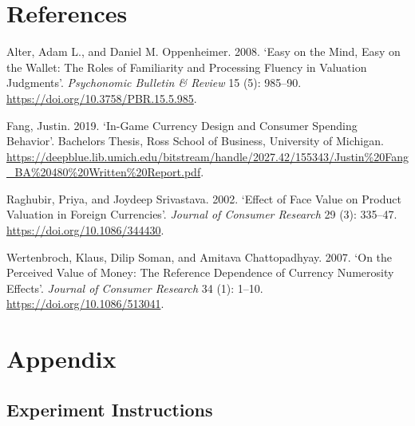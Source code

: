 \documentclass[
]{report}
\newlength{\cslhangindent}
\newenvironment{CSLReferences}[2] %
 {\begin{list}{}{%
  \setlength{\itemindent}{0pt}
  \setlength{\leftmargin}{0pt}
  \setlength{\parsep}{0pt}
  \ifodd #1
   \setlength{\leftmargin}{\cslhangindent}
   \setlength{\itemindent}{-1\cslhangindent}
  \fi
  \setlength{\itemsep}{#2\baselineskip}}}
 {\end{list}}
\begin{document}
\chapter{References}\label{references}

\label{refs}
\begin{CSLReferences}{1}{0}
Alter, Adam L., and Daniel M. Oppenheimer. 2008. {`Easy on the Mind,
Easy on the Wallet: The Roles of Familiarity and Processing Fluency in
Valuation Judgments'}. \emph{Psychonomic Bulletin {\&} Review} 15 (5):
985--90. \url{https://doi.org/10.3758/PBR.15.5.985}.

Fang, Justin. 2019. {`In-Game Currency Design and Consumer Spending
Behavior'}. Bachelor\textquotesingle s Thesis, Ross School of Business,
University of Michigan.
\url{https://deepblue.lib.umich.edu/bitstream/handle/2027.42/155343/Justin\%20Fang_BA\%20480\%20Written\%20Report.pdf}.

Raghubir, Priya, and Joydeep Srivastava. 2002. {`{Effect of Face Value
on Product Valuation in Foreign Currencies}'}. \emph{Journal of Consumer
Research} 29 (3): 335--47. \url{https://doi.org/10.1086/344430}.

Wertenbroch, Klaus, Dilip Soman, and Amitava Chattopadhyay. 2007. {`{On
the Perceived Value of Money: The Reference Dependence of Currency
Numerosity Effects}'}. \emph{Journal of Consumer Research} 34 (1):
1--10. \url{https://doi.org/10.1086/513041}.

\end{CSLReferences}

\chapter{Appendix}\label{appendix}

\section{Experiment Instructions}\label{experiment-instructions}
\end{document}
